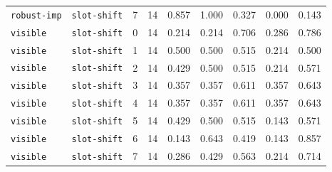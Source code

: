 \documentclass{article}
\begin{document}
\begin{center}
{\begin{tabular}{llllccccc}
\texttt{robust-imp} & \texttt{slot-shift} & 7 & 14 & 0.857 & 1.000 & 0.327 & 0.000 & 0.143 \\
\texttt{visible} & \texttt{slot-shift} & 0 & 14 & 0.214 & 0.214 & 0.706 & 0.286 & 0.786 \\
\texttt{visible} & \texttt{slot-shift} & 1 & 14 & 0.500 & 0.500 & 0.515 & 0.214 & 0.500 \\
\texttt{visible} & \texttt{slot-shift} & 2 & 14 & 0.429 & 0.500 & 0.515 & 0.214 & 0.571 \\
\texttt{visible} & \texttt{slot-shift} & 3 & 14 & 0.357 & 0.357 & 0.611 & 0.357 & 0.643 \\
\texttt{visible} & \texttt{slot-shift} & 4 & 14 & 0.357 & 0.357 & 0.611 & 0.357 & 0.643 \\
\texttt{visible} & \texttt{slot-shift} & 5 & 14 & 0.429 & 0.500 & 0.515 & 0.143 & 0.571 \\
\texttt{visible} & \texttt{slot-shift} & 6 & 14 & 0.143 & 0.643 & 0.419 & 0.143 & 0.857 \\
\texttt{visible} & \texttt{slot-shift} & 7 & 14 & 0.286 & 0.429 & 0.563 & 0.214 & 0.714 \\
\bottomrule
\end{tabular}%
}
\end{center}
\normalsize
\end{document}
